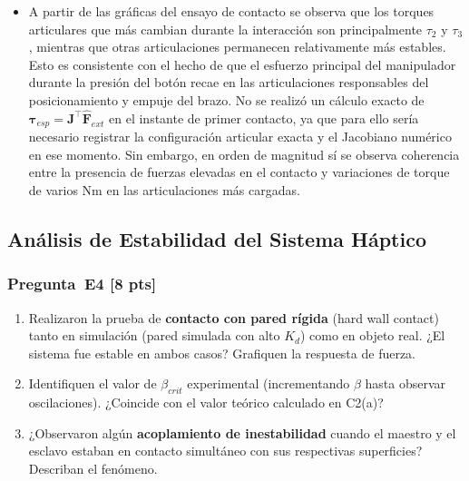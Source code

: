 \documentclass[journal,10pt,twoside]{IEEEtran}
\newcommand{\pts}[1]{\textbf{\color{tec_red}[#1 pts]}}
\begin{document}
\begin{itemize}
    \item A partir de las gráficas del ensayo de contacto se observa que los torques articulares que más cambian durante la interacción son principalmente \(\tau_2\) y \(\tau_3\), mientras que otras articulaciones permanecen relativamente más estables. Esto es consistente con el hecho de que el esfuerzo principal del manipulador durante la presión del botón recae en las articulaciones responsables del posicionamiento y empuje del brazo. No se realizó un cálculo exacto de \(\bm{\tau}_{esp} = \bm{J}^{\top}\hat{\bm{F}}_{ext}\) en el instante de primer contacto, ya que para ello sería necesario registrar la configuración articular exacta y el Jacobiano numérico en ese momento. Sin embargo, en orden de magnitud sí se observa coherencia entre la presencia de fuerzas elevadas en el contacto y variaciones de torque de varios Nm en las articulaciones más cargadas.
\end{itemize}

\subsection{Análisis de Estabilidad del Sistema Háptico}

\subsubsection*{Pregunta~E4 \pts{8}}
\begin{enumerate}[label=(\alph*)]
  \item Realizaron la prueba de \textbf{contacto con pared rígida}
        (hard wall contact) tanto en simulación (pared simulada con
        alto $K_d$) como en objeto real. ¿El sistema fue estable en
        ambos casos? Grafiquen la respuesta de fuerza.
  \item Identifiquen el valor de $\beta_{crit}$ experimental
        (incrementando $\beta$ hasta observar oscilaciones).
        ¿Coincide con el valor teórico calculado en C2(a)?
  \item ¿Observaron algún \textbf{acoplamiento de inestabilidad}
        cuando el maestro y el esclavo estaban en contacto simultáneo
        con sus respectivas superficies? Describan el fenómeno.
\end{enumerate}
\end{document}
